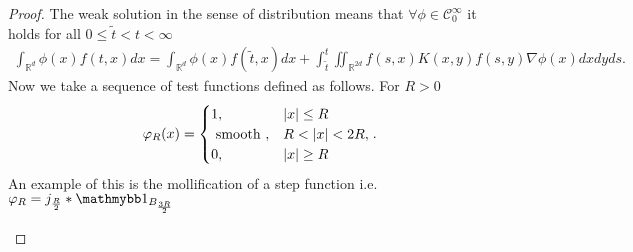 \begin{proof}
	 The weak solution in 
	the sense of distribution means that $\forall  \phi  \in  \mathcal{C}_0^{\infty} $ it holds for all $0\le \tilde{t}<t<\infty$
 \begin{align*}
   \int_{\mathbb{R}^{d} }\phi(x) f(t,x) dx = \int_{\mathbb{R}^{d} }\phi(x)f(\tilde{t},x ) dx + \int_{\tilde{t} }^{t} \iint_{\mathbb{R}^{2d} } f(s,x)K(x,y)f(s,y)\nabla \phi (x) dx dy ds
 .\end{align*}
Now we take a sequence of test functions defined as follows. For $ R >0$ 
 \begin{align*}
  \varphi_R(x) = \begin{cases}
    1 ,& \lvert x\rvert \le R\\
    \text{ smooth } ,& R < \lvert x\rvert < 2R,\\
    0 ,& \lvert x\rvert \ge R
  \end{cases}
 .\end{align*}
 An example of this is the mollification of a step function i.e. $\phi_R = j_{\frac{R}{2}}*\cha_{B_{\frac{3R}{2}}}$
\begin{figure}[H]
   \begin{center}
\end{center}
\end{figure}
\end{proof}
